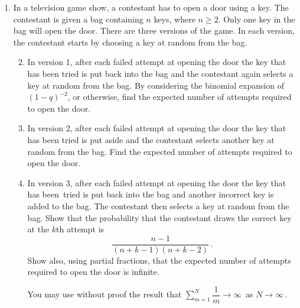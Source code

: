 \documentclass[a4, 11pt]{report}
\newlength{\qspace}
\newcounter{qnumber}
\newenvironment{question}%
 {\vspace{\qspace}
  \begin{enumerate}[\bfseries 1\quad][10]%
    \setcounter{enumi}{\value{qnumber}}%
    \item%
 }
{
  \end{enumerate}
  \filbreak
  \stepcounter{qnumber}
 }
\newenvironment{questionparts}[1][1]%
 {
  \begin{enumerate}[\bfseries (i)]%
    \setcounter{enumii}{#1}
    \addtocounter{enumii}{-1}
    \setlength{\itemsep}{2mm}
    \setlength{\parskip}{5pt}
 }
 {
  \end{enumerate}
 }
\def\ge{\geqslant}
\begin{document}
\begin{question}
In a television game show, a contestant has to open a door
using a key. The contestant is given a 
bag containing $n$ keys, 
where $n\ge2$. Only one key in the bag will open the door. 
There are three versions
of the game. In each version, the contestant starts by choosing a 
key at random from the bag.
\begin{questionparts}
\item
In version 1, after each failed attempt at opening the door
 the key that has
been tried is put back into the bag and the contestant again
selects a key at random from the bag.
By considering the binomial expansion of $( 1 - q)^{-2}$,
or otherwise, find the expected number of attempts required to open 
the door.
\item
In 
version 2, after each failed attempt at opening the door
the key that has been tried is put aside and the contestant 
selects another key
at random
from the bag. Find the expected number of 
attempts required to open the door.
\item 
In version
3, after each failed attempt at opening the door the key that has
been~tried is put back into the bag and another incorrect key is added to 
the bag. 
The contestant then selects a key at random from the bag. 
Show that  the probability that the contestant draws the
correct key at the $k$th attempt is 
\[
\frac{n-1}{(n+k-1)(n+k-2)}  
\,.
\]
Show also, using partial fractions, that 
 the expected number of attempts required to open the door is infinite.

You may use without proof the result that 
$
\displaystyle
\sum_{m=1}^N \dfrac 1 m \to \infty
 \,
$
as $N\to \infty\,$.
\end{questionparts}

\end{question}
\end{document}
